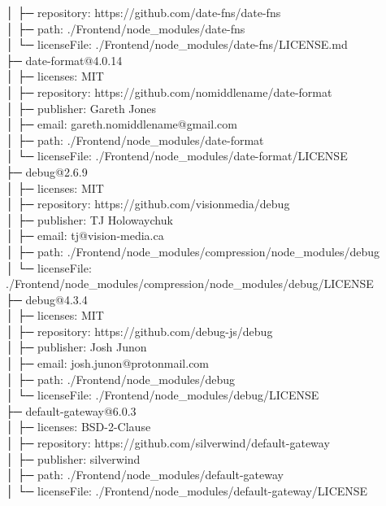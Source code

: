 \documentclass[
    paper=a4,
    twoside=false,
    parskip=half,
    listof=entryprefix,
    listof=totoc,
    index=totoc,
    bibliography=totoc,
    headsepline,
]{scrbook}
\begin{document}
    │  ├─ repository: https://github.com/date-fns/date-fns\\
    │  ├─ path: ./Frontend/node\_modules/date-fns\\
    │  └─ licenseFile: ./Frontend/node\_modules/date-fns/LICENSE.md\\
    ├─ date-format@4.0.14\\
    │  ├─ licenses: MIT\\
    │  ├─ repository: https://github.com/nomiddlename/date-format\\
    │  ├─ publisher: Gareth Jones\\
    │  ├─ email: gareth.nomiddlename@gmail.com\\
    │  ├─ path: ./Frontend/node\_modules/date-format\\
    │  └─ licenseFile: ./Frontend/node\_modules/date-format/LICENSE\\
    ├─ debug@2.6.9\\
    │  ├─ licenses: MIT\\
    │  ├─ repository: https://github.com/visionmedia/debug\\
    │  ├─ publisher: TJ Holowaychuk\\
    │  ├─ email: tj@vision-media.ca\\
    │  ├─ path: ./Frontend/node\_modules/compression/node\_modules/debug\\
    │  └─ licenseFile: ./Frontend/node\_modules/compression/node\_modules/debug/LICENSE\\
    ├─ debug@4.3.4\\
    │  ├─ licenses: MIT\\
    │  ├─ repository: https://github.com/debug-js/debug\\
    │  ├─ publisher: Josh Junon\\
    │  ├─ email: josh.junon@protonmail.com\\
    │  ├─ path: ./Frontend/node\_modules/debug\\
    │  └─ licenseFile: ./Frontend/node\_modules/debug/LICENSE\\
    ├─ default-gateway@6.0.3\\
    │  ├─ licenses: BSD-2-Clause\\
    │  ├─ repository: https://github.com/silverwind/default-gateway\\
    │  ├─ publisher: silverwind\\
    │  ├─ path: ./Frontend/node\_modules/default-gateway\\
    │  └─ licenseFile: ./Frontend/node\_modules/default-gateway/LICENSE\\
\end{document}
